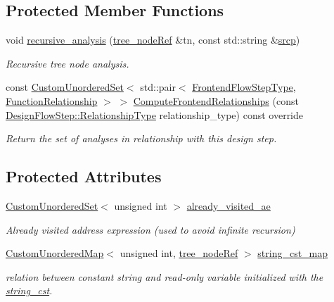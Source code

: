 \subsection*{Protected Member Functions}
\begin{DoxyCompactItemize}
\item 
void \hyperlink{classstring__cst__fix_a2f68c8aa5c58dc2db4ba9f25a02d3160}{recursive\+\_\+analysis} (\hyperlink{tree__node_8hpp_a6ee377554d1c4871ad66a337eaa67fd5}{tree\+\_\+node\+Ref} \&tn, const std\+::string \&\hyperlink{structsrcp}{srcp})
\begin{DoxyCompactList}\small\item\em Recursive tree node analysis. \end{DoxyCompactList}\item 
const \hyperlink{classCustomUnorderedSet}{Custom\+Unordered\+Set}$<$ std\+::pair$<$ \hyperlink{frontend__flow__step_8hpp_afeb3716c693d2b2e4ed3e6d04c3b63bb}{Frontend\+Flow\+Step\+Type}, \hyperlink{classFrontendFlowStep_af7cf30f2023e5b99e637dc2058289ab0}{Function\+Relationship} $>$ $>$ \hyperlink{classstring__cst__fix_a5b196cc1483a0239528d31c371d9834e}{Compute\+Frontend\+Relationships} (const \hyperlink{classDesignFlowStep_a723a3baf19ff2ceb77bc13e099d0b1b7}{Design\+Flow\+Step\+::\+Relationship\+Type} relationship\+\_\+type) const override
\begin{DoxyCompactList}\small\item\em Return the set of analyses in relationship with this design step. \end{DoxyCompactList}\end{DoxyCompactItemize}
\subsection*{Protected Attributes}
\begin{DoxyCompactItemize}
\item 
\hyperlink{classCustomUnorderedSet}{Custom\+Unordered\+Set}$<$ unsigned int $>$ \hyperlink{classstring__cst__fix_a7ff7f8e1afa38b3b092676ced537f35c}{already\+\_\+visited\+\_\+ae}
\begin{DoxyCompactList}\small\item\em Already visited address expression (used to avoid infinite recursion) \end{DoxyCompactList}\item 
\hyperlink{custom__map_8hpp_ad1ed68f2ff093683ab1a33522b144adc}{Custom\+Unordered\+Map}$<$ unsigned int, \hyperlink{tree__node_8hpp_a6ee377554d1c4871ad66a337eaa67fd5}{tree\+\_\+node\+Ref} $>$ \hyperlink{classstring__cst__fix_a4c1ab9ed1cb2b96a5bc6f0821b42ef08}{string\+\_\+cst\+\_\+map}
\begin{DoxyCompactList}\small\item\em relation between constant string and read-\/only variable initialized with the \hyperlink{structstring__cst}{string\+\_\+cst}. \end{DoxyCompactList}\end{DoxyCompactItemize}

